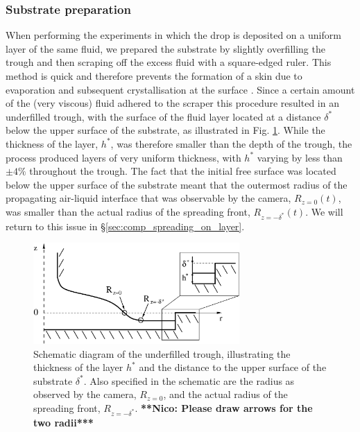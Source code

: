 \documentclass[aip,graphicx]{revtex4-1}
\begin{document}
\subsubsection{Substrate preparation\label{sec:creating_layer}}
When performing the experiments in which the drop is 
deposited on a uniform layer of the same fluid, we prepared the
substrate by slightly overfilling the trough and then scraping
off the excess fluid with a square-edged ruler. 
This method is quick and therefore prevents the formation of a skin
due to evaporation and subsequent crystallisation at the surface \cite{lees2012sugar,edwards2000science}.
Since a certain amount of the (very viscous) fluid 
adhered to the scraper this procedure resulted in an underfilled trough, 
with the surface of the fluid layer located at a distance $\delta^*$ 
below the upper surface of the substrate, as illustrated in Fig. 
\ref{fig:axisym_drop_nozzle_gap}. While the thickness of the layer, 
$h^*$, was therefore smaller than the depth of the trough, the
process produced layers of very uniform thickness, with
$h^*$ varying by less than $\pm 4\%$ throughout the trough. 
The fact that the initial free surface was located below the
upper surface of the substrate meant that the outermost radius
of the propagating air-liquid interface that was observable by the camera,
$R_{z=0}(t)$, was smaller than the actual radius of the spreading front,
 $R_{z=-\delta^*}(t)$.
We will return to this issue in \S \ref{sec:comp_spreading_on_layer}.

\begin{figure}[!ht]
\centering
\includegraphics[width=0.7\textwidth]{figures/axisym_drop_nozzle_gap_updated.eps}
\caption{Schematic diagram of the underfilled trough, illustrating the
thickness of the layer $h^*$ and the distance to the upper surface of
the substrate $\delta^*$. Also specified in the schematic are the
radius as observed by the camera, $R_{z=0}$, and the actual radius of
the spreading front, $R_{z=-\delta^*}$. {\bf ***Nico: Please draw
  arrows for the two radii***}}
\label{fig:axisym_drop_nozzle_gap}
\end{figure}
 
\end{document}
